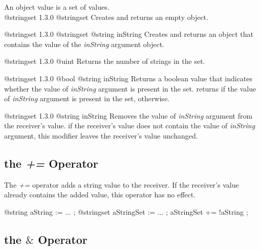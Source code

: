 

An  object value is a set of  values.\\


{@stringset}
{1.3.0}
{@stringset}
{Creates and returns an empty  object.}
{}

{@stringset}
{1.3.0}
{@stringset}
{@string inString}
{Creates and returns an  object that contains the value of the \emph{inString} argument object.}
{}


{@stringset}
{1.3.0}
{@uint}
{Returns the number of strings in the set.}
{}



{@stringset}
{1.3.0}
{@bool}
{@string inString}
{Returns a boolean value that indicates whether the value of \emph{inString} argument is present in the set.}
{returns  if the value of \emph{inString} argument is present in the set,  otherwise.}




{@stringset}
{1.3.0}
{@string inString}
{Removes the value of \emph{inString} argument from the receiver's value.}
{if the receiver's value does not contain the value of \emph{inString} argument, this modifier leaves the receiver's value unchanged.}






\subsection{the \emph{+=} Operator}

The \emph{+=} operator adds a string value to the receiver. If the receiver's value already contains the added value, this operator has no effect.

\exempleTroisLignes
{}
{@string aString := ... ;}
{@stringset aStringSet := ... ;}
{aStringSet += !aString ;}




\subsection{the \emph{$\&$} Operator}

